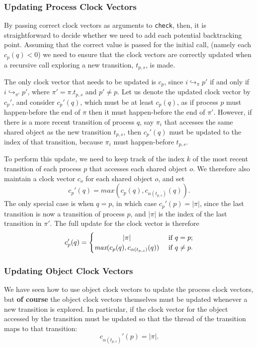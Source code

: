 \documentclass[12pt,a4paper,twoside,openright]{report}
\begin{document}
\subsubsection{Updating Process Clock Vectors}
By passing correct clock vectors as arguments to
\texttt{check}, then, it is straightforward
to decide whether we need to add each potential
backtracking point.
Assuming that the correct value is passed for
the initial call,
(namely each $c_p(q) < 0$)
we need to ensure that the
clock vectors are correctly updated when
a recursive call exploring a new transition,
$t_{p,s}$, is made.

The only clock vector that needs to be updated
is $c_p$, since $i \hookrightarrow_\pi p'$ if
and only if $i \hookrightarrow_{\pi'} p'$,
where $\pi' = \pi.t_{p,s}$ and $p' \neq p$.
Let us denote the updated clock vector
by $c_p'$, and consider $c_p'(q)$, which
must be at least $c_p(q)$, as if process
$p$ must happen-before the end of $\pi$
then it must happen-before the end of $\pi'$.
However, if there is a more recent transition
of process $q$, say $\pi_i$
that accesses the same shared
object as the new transition $t_{p,s}$, then
$c_p'(q)$ must be updated to the index of
that transition, because $\pi_i$ must
happen-before $t_{p,s}$.

To perform this update, we need to keep
track of the index $k$ of the most recent
transition of each process $p$ that
accesses each shared object $o$. We therefore
also maintain a clock vector $c_o$ for each
shared object $o$, and set
\[ c_p'(q) =\textit{max}(c_p(q),
		c_{\alpha(t_{p,s})}(q)).\]
The only special case is when $q = p$,
in which case $c_p'(p) = |\pi|$, since
the last transition is now a transition of
process $p$, and $|\pi|$ is the index
of the last transition in $\pi'$. The
full update for the clock vector is therefore
\[ c_p'(q) =
\begin{cases}
	\hfill |\pi| \hfill & \text{ if } q = p; \\
	\hfill \textit{max}(c_p(q),
		c_{\alpha(t_{p,s})}(q))
		\hfill & \text{ if } q \neq p.
\end{cases}\]


\subsubsection{Updating Object Clock Vectors}

We have seen how to use object clock vectors to
update the process clock vectors, but \textbf{of course}
the object clock vectors themselves must be
updated whenever a new transition is explored.
In particular, if the clock vector for the
object accessed by the transition must be
updated so that the thread of the transition
maps to that transition:
\[c_{\alpha(t_{p,s})}'(p) = |\pi|.\]
\end{document}
